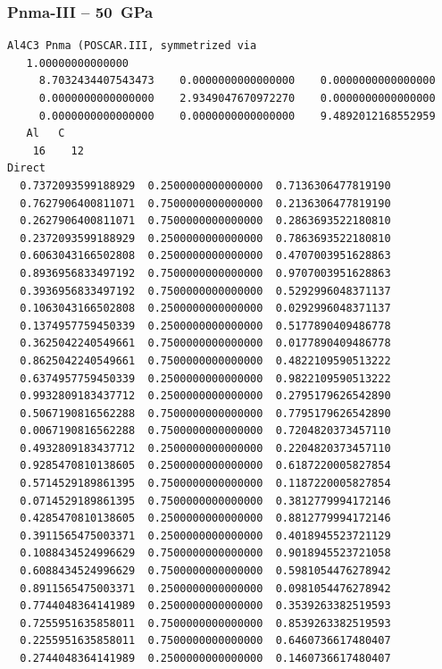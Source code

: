 \subsubsection*{Pnma-III -- 50~GPa}
\begin{footnotesize}
\begin{verbatim}
Al4C3 Pnma (POSCAR.III, symmetrized via 
   1.00000000000000     
     8.7032434407543473    0.0000000000000000    0.0000000000000000
     0.0000000000000000    2.9349047670972270    0.0000000000000000
     0.0000000000000000    0.0000000000000000    9.4892012168552959
   Al   C 
    16    12
Direct
  0.7372093599188929  0.2500000000000000  0.7136306477819190
  0.7627906400811071  0.7500000000000000  0.2136306477819190
  0.2627906400811071  0.7500000000000000  0.2863693522180810
  0.2372093599188929  0.2500000000000000  0.7863693522180810
  0.6063043166502808  0.2500000000000000  0.4707003951628863
  0.8936956833497192  0.7500000000000000  0.9707003951628863
  0.3936956833497192  0.7500000000000000  0.5292996048371137
  0.1063043166502808  0.2500000000000000  0.0292996048371137
  0.1374957759450339  0.2500000000000000  0.5177890409486778
  0.3625042240549661  0.7500000000000000  0.0177890409486778
  0.8625042240549661  0.7500000000000000  0.4822109590513222
  0.6374957759450339  0.2500000000000000  0.9822109590513222
  0.9932809183437712  0.2500000000000000  0.2795179626542890
  0.5067190816562288  0.7500000000000000  0.7795179626542890
  0.0067190816562288  0.7500000000000000  0.7204820373457110
  0.4932809183437712  0.2500000000000000  0.2204820373457110
  0.9285470810138605  0.2500000000000000  0.6187220005827854
  0.5714529189861395  0.7500000000000000  0.1187220005827854
  0.0714529189861395  0.7500000000000000  0.3812779994172146
  0.4285470810138605  0.2500000000000000  0.8812779994172146
  0.3911565475003371  0.2500000000000000  0.4018945523721129
  0.1088434524996629  0.7500000000000000  0.9018945523721058
  0.6088434524996629  0.7500000000000000  0.5981054476278942
  0.8911565475003371  0.2500000000000000  0.0981054476278942
  0.7744048364141989  0.2500000000000000  0.3539263382519593
  0.7255951635858011  0.7500000000000000  0.8539263382519593
  0.2255951635858011  0.7500000000000000  0.6460736617480407
  0.2744048364141989  0.2500000000000000  0.1460736617480407
 

\end{verbatim}
\end{footnotesize}
